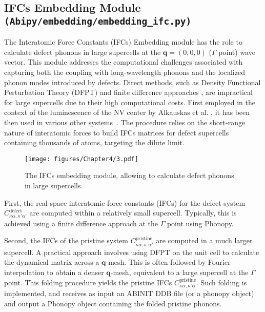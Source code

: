 \subsection*{IFCs Embedding Module \texttt{(Abipy/embedding/embedding\_ifc.py)}}
The Interatomic Force Constants (IFCs) Embedding module has the role to calculate defect phonons in large supercells at the $\mathbf{q}=(0,0,0)$ ($\Gamma$ point) wave vector. This module addresses the computational challenges associated with capturing both the coupling with long-wavelength phonons and the localized phonon modes introduced by defects. Direct methods, such as Density Functional Perturbation Theory (DFPT) \cite{gonze1997dynamical} and finite difference approaches \cite{togo2015first}, are impractical for large supercells due to their high computational costs. First employed in the context of the luminescence of the NV center by Alkauskas et al. \cite{alkauskas2014}, it has been then used in various other systems~\cite{jin2021photoluminescence, bouquiaux2023first, razinkovas2021vibrational, maciaszek2023application, jin2022vibrationally}. The procedure relies on the short-range nature of interatomic forces to build IFCs matrices for defect supercells containing thousands of atoms, targeting the dilute limit. 
\begin{figure}[h!]
	\centering
	\texttt{[image: figures/Chapter4/3.pdf]}
	\caption[IFCs embedding module]{The IFCs embedding module, allowing to calculate defect phonons in large supercells.}
	\label{fig:IFCs_emb}
\end{figure}

First, the real-space interatomic force constants (IFCs) for the defect system $C_{\kappa\alpha,\kappa’\alpha'}^{\mathrm{defect}}$ are computed within a relatively small supercell. Typically, this is achieved using a finite difference approach at the $\Gamma$ point using Phonopy. 

Second, the IFCs of the pristine system $C_{\kappa\alpha,\kappa’\alpha'}^{\mathrm{pristine}}$ are computed in a much larger supercell. A practical approach involves using DFPT on the unit cell to calculate the dynamical matrix across a $\mathbf{q}$-mesh. This is often followed by Fourier interpolation to obtain a denser $\mathbf{q}$-mesh, equivalent to a large supercell at the $\Gamma$ point. This folding procedure yields the pristine IFCs $C_{\kappa\alpha,\kappa’\alpha}^{\mathrm{pristine}}$. Such folding is implemented, and receives as input an ABINIT DDB file (or a phonopy object) and output a Phonopy object containing the folded pristine phonons.  


